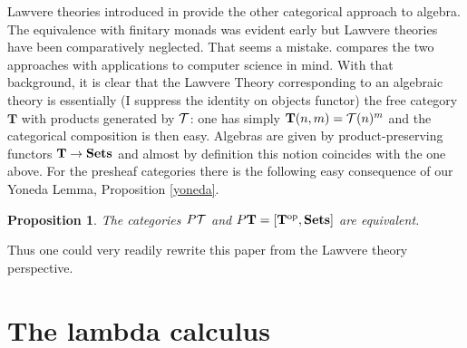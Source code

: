 \documentclass[12pt, amstex, amssymb]{article}
\newtheorem{proposition}[theorem]{Proposition}
\newcommand{\mcat}{\cal}
\newcommand{\cat}{\mathbf}
\begin{document}
Lawvere theories introduced in \cite{Law63} provide
the other categorical approach to algebra. The equivalence 
with finitary monads was evident early but
Lawvere theories have been comparatively neglected.
That seems a mistake. \cite{HP07} compares the two approaches 
with applications to computer science in mind. With that
background, it is clear that the Lawvere Theory 
corresponding to an algebraic theory is essentially
(I suppress the identity on objects functor)
the free category $\cat T$ with products generated 
by $\mcat T$: one has simply ${\cat T}(n,m) = {\mcat T}(n)^m$
and the categorical composition is then easy.
Algebras are given by product-preserving 
functors ${\cat T} \to {\bf Sets}$ and almost by
definition this notion coincides with the one above.
For the presheaf categories there is the following easy consequence
of our Yoneda Lemma, Proposition \ref{yoneda}.
\begin{proposition}
The categories $P{\mcat T}$ 
and $P{\cat T} =
[{\cat T}^{\rm op},{\bf Sets}]$ are equivalent.
\end{proposition} 
Thus one could 
very readily rewrite this paper from the
Lawvere theory perspective.

\section{The lambda calculus}
\end{document}
